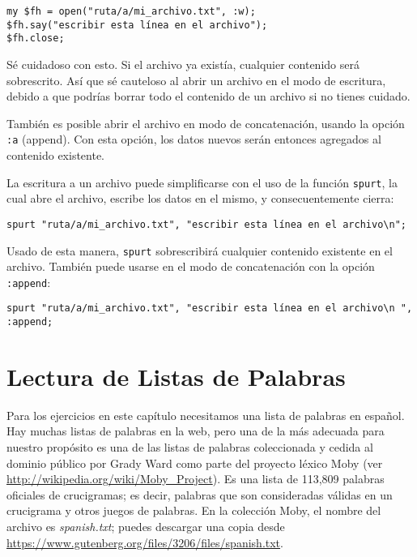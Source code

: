 \begin{verbatim}
my $fh = open("ruta/a/mi_archivo.txt", :w);
$fh.say("escribir esta línea en el archivo");
$fh.close;
\end{verbatim}

Sé cuidadoso con esto. Si el archivo ya existía, cualquier
contenido será sobrescrito. Así que sé cauteloso al abrir un archivo
en el modo de escritura, debido a que podrías borrar todo el 
contenido de un archivo si no tienes cuidado. 

También es posible abrir el archivo en modo de concatenación, usando
la opción {\tt :a} (append). Con esta opción, los datos nuevos serán 
entonces agregados al contenido existente.

La escritura a un archivo puede simplificarse con el uso de la función
{\tt spurt}, la cual abre el archivo, escribe los datos en el mismo, y
consecuentemente cierra:

\begin{verbatim}
spurt "ruta/a/mi_archivo.txt", "escribir esta línea en el archivo\n";
\end{verbatim}

Usado de esta manera, {\tt spurt} sobrescribirá cualquier contenido existente
en el archivo. También puede usarse en el modo de concatenación con la 
opción {\tt :append}:

\begin{verbatim}
spurt "ruta/a/mi_archivo.txt", "escribir esta línea en el archivo\n ", :append;
\end{verbatim}


\section{Lectura de Listas de Palabras}
\label{wordlist}

Para los ejercicios en este capítulo necesitamos una lista de palabras
en español. Hay muchas listas de palabras en la web, pero una de la
más adecuada para nuestro propósito es una de las listas de palabras
coleccionada y cedida al dominio público por Grady Ward como parte
del proyecto léxico Moby (ver \url{http://wikipedia.org/wiki/Moby_Project}).
Es una lista de 113,809 palabras oficiales de crucigramas; es decir, 
palabras que son consideradas válidas en un crucigrama y otros juegos de
palabras. En la colección Moby, el nombre del archivo es \emph{spanish.txt};
puedes descargar una copia
desde \url{https://www.gutenberg.org/files/3206/files/spanish.txt}.

